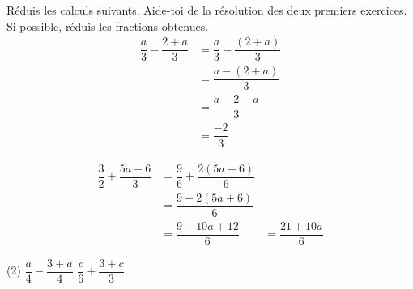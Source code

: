 %
%
Réduis les calculs suivants. Aide-toi de la résolution des deux premiers exercices. \\
  Si possible, réduis les fractions obtenues.
    \begin{align*}
      \dfrac{a}{3} - \dfrac{2+a}{3}
      &= \dfrac{a}{3} - \dfrac{\left(2+a\right)}{3}\\
      &= \dfrac{a-\left(2+a\right)}{3}\\
      &= \dfrac{a-2-a}{3}\\
      &= \dfrac{-2}{3}
    \end{align*}

    \begin{align*}
      \dfrac{3}{2} + \dfrac{5a+6}{3}
      &= \dfrac{9}{6} + \dfrac{2\left(5a+6\right)}{6}\\
      &= \dfrac{9+2\left(5a+6\right)}{6}\\
      &= \dfrac{9+10a+12}{6}
      &= \dfrac{21+10a}{6}
    \end{align*}
  \begin{tasks}(2)
    \task $\dfrac{a}{4}-\dfrac{3+a}{4}$
    \task $\dfrac{c}{6} + \dfrac{3+c}{3}$
  \end{tasks}
